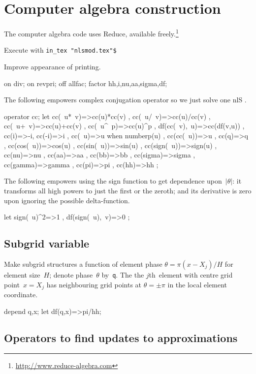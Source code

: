 \documentclass[12pt,a5paper]{article}
\begin{document}
\section{Computer algebra construction}

The computer algebra code uses Reduce, available freely.\footnote{\url{http://www.reduce-algebra.com}}

Execute with \verb|in_tex "nlsmod.tex"$|

Improve appearance of printing.
\begin{reduce}
on div; on revpri; off allfac;
factor hh,i,nu,aa,sigma,df;
\end{reduce}

The following empowers complex conjugation operator so we just solve one nlS \pde.
\begin{reduce}
operator cc;
let { cc(~u*~v)=>cc(u)*cc(v) 
    , cc(~u/~v)=>cc(u)/cc(v) 
    , cc(~u+~v)=>cc(u)+cc(v) 
    , cc(~u^~p)=>cc(u)^p 
    , df(cc(~v),~u)=>cc(df(v,u))
    , cc(i)=>-i, cc(-i)=>i
    , cc(~u)=>u when numberp(u)
    , cc(cc(~u))=>u
    , cc(q)=>q
    , cc(cos(~u))=>cos(u)
    , cc(sin(~u))=>sin(u)
    , cc(sign(~u))=>sign(u)
    , cc(nu)=>nu
    , cc(aa)=>aa
    , cc(bb)=>bb
    , cc(sigma)=>sigma
    , cc(gamma)=>gamma
    , cc(pi)=>pi
    , cc(hh)=>hh
    };
\end{reduce}

The following empowers using the sign function to get dependence upon~\(|\theta|\): it transforms all high powers to just the first or the zeroth; and its derivative is zero upon ignoring the possible delta-function.
\begin{reduce}
let { sign(~u)^2=>1
    , df(sign(~u),~v)=>0 };
\end{reduce}

\subsection{Subgrid variable}

Make subgrid structures a function of element phase
$\theta=\pi(x-X_j)/H$ for element size~$H$; denote phase~$\theta$
by~\verb|q|.
The the $j$th~element with centre grid point~\(x=X_j\) has neighbouring grid points at $\theta=\pm\pi$ in the local element coordinate.

\begin{reduce}
depend q,x;
let df(q,x)=>pi/hh;
\end{reduce}


\subsection{Operators to find updates to approximations}
\end{document}
